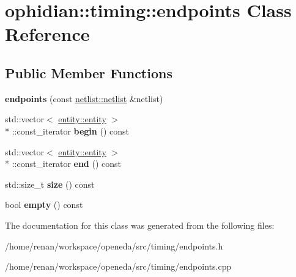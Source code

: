 \hypertarget{classophidian_1_1timing_1_1endpoints}{\section{ophidian\-:\-:timing\-:\-:endpoints Class Reference}
\label{classophidian_1_1timing_1_1endpoints}
}
\subsection*{Public Member Functions}
\begin{DoxyCompactItemize}
\item 
\hypertarget{classophidian_1_1timing_1_1endpoints_a62ced46f42aad54aeb384e7a963a3e56}{{\bfseries endpoints} (const \hyperlink{classophidian_1_1netlist_1_1netlist}{netlist\-::netlist} \&netlist)}\label{classophidian_1_1timing_1_1endpoints_a62ced46f42aad54aeb384e7a963a3e56}

\item 
\hypertarget{classophidian_1_1timing_1_1endpoints_afbcfe10781742f1db99a0cbf07f46f00}{std\-::vector$<$ \hyperlink{classophidian_1_1entity_1_1entity}{entity\-::entity} $>$\\*
\-::const\-\_\-iterator {\bfseries begin} () const }\label{classophidian_1_1timing_1_1endpoints_afbcfe10781742f1db99a0cbf07f46f00}

\item 
\hypertarget{classophidian_1_1timing_1_1endpoints_aca5cc64f3f8782a64eaf121e0300754c}{std\-::vector$<$ \hyperlink{classophidian_1_1entity_1_1entity}{entity\-::entity} $>$\\*
\-::const\-\_\-iterator {\bfseries end} () const }\label{classophidian_1_1timing_1_1endpoints_aca5cc64f3f8782a64eaf121e0300754c}

\item 
\hypertarget{classophidian_1_1timing_1_1endpoints_af743daa36f144a33837719b44767958a}{std\-::size\-\_\-t {\bfseries size} () const }\label{classophidian_1_1timing_1_1endpoints_af743daa36f144a33837719b44767958a}

\item 
\hypertarget{classophidian_1_1timing_1_1endpoints_a935ba04e18e780a70d3a11c8ad12e2c6}{bool {\bfseries empty} () const }\label{classophidian_1_1timing_1_1endpoints_a935ba04e18e780a70d3a11c8ad12e2c6}

\end{DoxyCompactItemize}


The documentation for this class was generated from the following files\-:\begin{DoxyCompactItemize}
\item 
/home/renan/workspace/openeda/src/timing/endpoints.\-h\item 
/home/renan/workspace/openeda/src/timing/endpoints.\-cpp\end{DoxyCompactItemize}
